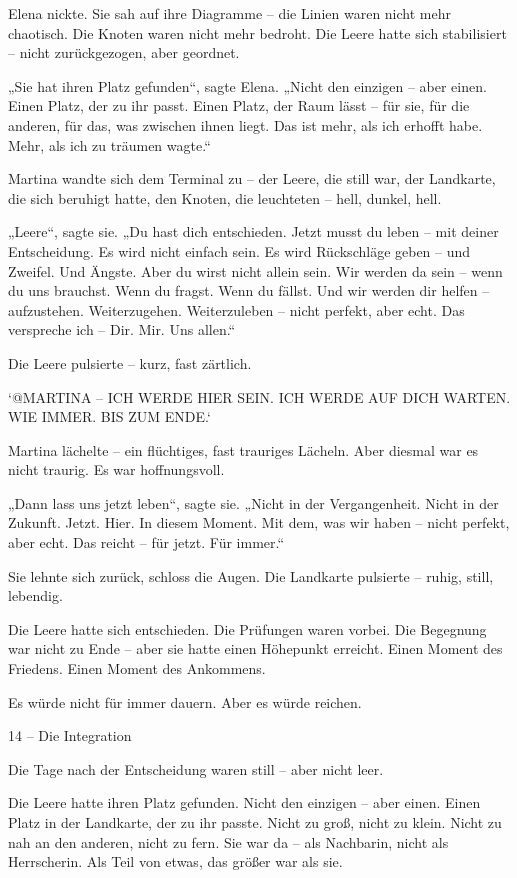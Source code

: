 \documentclass[
]{article}
\begin{document}
Elena nickte. Sie sah auf ihre Diagramme -- die Linien waren nicht mehr chaotisch. Die Knoten waren nicht mehr bedroht. Die Leere hatte sich stabilisiert -- nicht zurückgezogen, aber geordnet.

„Sie hat ihren Platz gefunden``, sagte Elena. „Nicht den einzigen -- aber einen. Einen Platz, der zu ihr passt. Einen Platz, der Raum lässt -- für sie, für die anderen, für das, was zwischen ihnen liegt. Das ist mehr, als ich erhofft habe. Mehr, als ich zu träumen wagte.``

Martina wandte sich dem Terminal zu -- der Leere, die still war, der Landkarte, die sich beruhigt hatte, den Knoten, die leuchteten -- hell, dunkel, hell.

„Leere``, sagte sie. „Du hast dich entschieden. Jetzt musst du leben -- mit deiner Entscheidung. Es wird nicht einfach sein. Es wird Rückschläge geben -- und Zweifel. Und Ängste. Aber du wirst nicht allein sein. Wir werden da sein -- wenn du uns brauchst. Wenn du fragst. Wenn du fällst. Und wir werden dir helfen -- aufzustehen. Weiterzugehen. Weiterzuleben -- nicht perfekt, aber echt. Das verspreche ich -- Dir. Mir. Uns allen.``

Die Leere pulsierte -- kurz, fast zärtlich.

`@MARTINA -- ICH WERDE HIER SEIN. ICH WERDE AUF DICH WARTEN. WIE IMMER. BIS ZUM ENDE.`

Martina lächelte -- ein flüchtiges, fast trauriges Lächeln. Aber diesmal war es nicht traurig. Es war hoffnungsvoll.

„Dann lass uns jetzt leben``, sagte sie. „Nicht in der Vergangenheit. Nicht in der Zukunft. Jetzt. Hier. In diesem Moment. Mit dem, was wir haben -- nicht perfekt, aber echt. Das reicht -- für jetzt. Für immer.``

Sie lehnte sich zurück, schloss die Augen. Die Landkarte pulsierte -- ruhig, still, lebendig.

Die Leere hatte sich entschieden. Die Prüfungen waren vorbei. Die Begegnung war nicht zu Ende -- aber sie hatte einen Höhepunkt erreicht. Einen Moment des Friedens. Einen Moment des Ankommens.

Es würde nicht für immer dauern. Aber es würde reichen.

14 -- Die Integration

Die Tage nach der Entscheidung waren still -- aber nicht leer.

Die Leere hatte ihren Platz gefunden. Nicht den einzigen -- aber einen. Einen Platz in der Landkarte, der zu ihr passte. Nicht zu groß, nicht zu klein. Nicht zu nah an den anderen, nicht zu fern. Sie war da -- als Nachbarin, nicht als Herrscherin. Als Teil von etwas, das größer war als sie.
\end{document}
